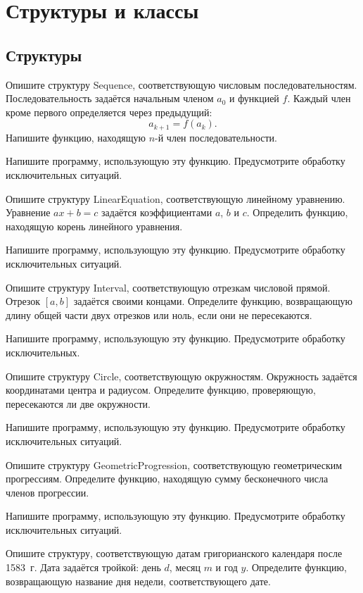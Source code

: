 \section{Структуры и классы}

\subsection{Структуры}

\task Опишите структуру Sequence, соответствующую числовым
последовательностям. Последовательность задаётся начальным членом
$a_0$ и функцией $f$. Каждый член кроме первого определяется через
предыдущий:
\[
a_{k+1} = f(a_k).
\]
Напишите функцию, находящую $n$-й член последовательности.

Напишите программу, использующую эту функцию. Предусмотрите обработку
исключительных ситуаций.

\task Опишите структуру LinearEquation, соответствующую линейному
уравнению. Уравнение $ax+b=c$ задаётся коэффициентами $a$, $b$ и $c$.
Определить функцию, находящую корень линейного уравнения.

Напишите программу, использующую эту функцию. Предусмотрите обработку
исключительных ситуаций.

\task Опишите структуру Interval, соответствующую отрезкам числовой
прямой. Отрезок $[a, b]$ задаётся своими концами. Определите функцию,
возвращающую длину общей части двух отрезков или ноль, если они не
пересекаются.

Напишите программу, использующую эту функцию. Предусмотрите обработку
исключительных.

\task Опишите структуру Circle, соответствующую
окружностям. Окружность задаётся координатами центра и
радиусом. Определите функцию, проверяющую, пересекаются ли две
окружности.

Напишите программу, использующую эту функцию. Предусмотрите обработку
исключительных ситуаций.

\task Опишите структуру GeometricProgression, соответствующую
геометрическим прогрессиям. Определите функцию, находящую сумму
бесконечного числа членов прогрессии.

Напишите программу, использующую эту функцию. Предусмотрите обработку
исключительных ситуаций.

\task Опишите структуру, соответствующую датам григорианского
календаря после 1583~г. Дата задаётся тройкой: день $d$, месяц $m$ и
год $y.$ Определите функцию, возвращающую название дня недели,
соответствующего дате.

